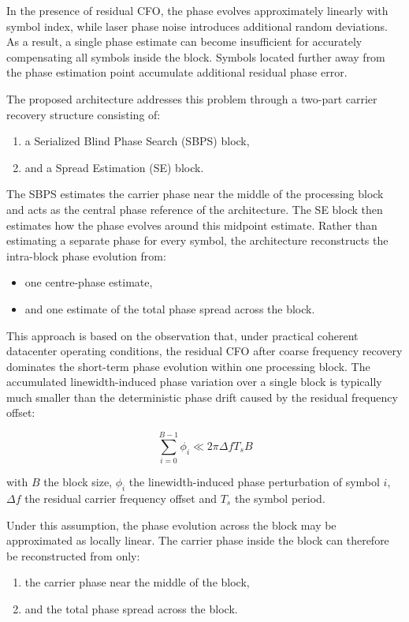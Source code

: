 In the presence of residual \ac{CFO}, the phase evolves approximately linearly with symbol index, while laser phase noise introduces additional random deviations. As a result, a single phase estimate can become insufficient for accurately compensating all symbols inside the block. Symbols located further away from the phase estimation point accumulate additional residual phase error.

The proposed architecture addresses this problem through a two-part carrier recovery structure consisting of:
\begin{enumerate}
    \item a Serialized Blind Phase Search (\ac{SBPS}) block,
    \item and a Spread Estimation (\ac{SE}) block.
\end{enumerate}

The \ac{SBPS} estimates the carrier phase near the middle of the processing block and acts as the central phase reference of the architecture. The \ac{SE} block then estimates how the phase evolves around this midpoint estimate. Rather than estimating a separate phase for every symbol, the architecture reconstructs the intra-block phase evolution from:
\begin{itemize}
    \item one centre-phase estimate,
    \item and one estimate of the total phase spread across the block.
\end{itemize}

This approach is based on the observation that, under practical coherent datacenter operating conditions, the residual \ac{CFO} after coarse frequency recovery dominates the short-term phase evolution within one processing block. The accumulated linewidth-induced phase variation over a single block is typically much smaller than the deterministic phase drift caused by the residual frequency offset:

\begin{equation}
    \sum_{i=0}^{B-1}\phi_i \ll 2\pi \Delta f T_s B
    \label{eq:SE-linear-assumption}
\end{equation}

with $B$ the block size, $\phi_i$ the linewidth-induced phase perturbation of symbol $i$, $\Delta f$ the residual carrier frequency offset and $T_s$ the symbol period.

Under this assumption, the phase evolution across the block may be approximated as locally linear. The carrier phase inside the block can therefore be reconstructed from only:
\begin{enumerate}
    \item the carrier phase near the middle of the block,
    \item and the total phase spread across the block.
\end{enumerate}

